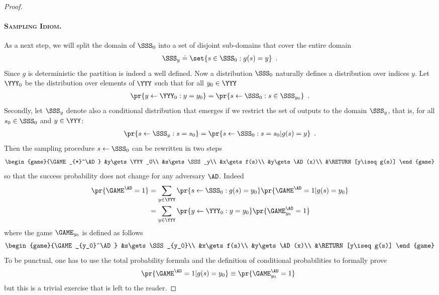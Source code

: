 \documentclass{llncs}
\begin{document}
\begin{proof}
\paragraph{\textsc{Sampling Idiom}.}
As a next step, we will split the domain of $\SSS_0$ into a set of
disjoint sub-domains that cover the entire domain
\begin{align*}
  \SSS_y\doteq\set{s\in\SSS_0: g(s)=y}\enspace.
\end{align*}
Since $g$ is deterministic the partition is indeed a well defined. Now
a distribution $\SSS_0$ naturally defines a distribution over indices
$y$. Let $\YYY_0$ be the distribution over elements of $\YYY$ such that
for all $y_0\in\YYY$
\begin{align*}
  \pr{y\gets\YYY_0:y=y_0}=\pr{s\gets\SSS_0:s\in\SSS_{y_0}}\enspace.
\end{align*}
Secondly, let $\SSS_y$ denote also a conditional distribution that
emerges if we restrict the set of outputs to the domain $\SSS_y$, that
is, for all $s_0\in\SSS_0$ and $y\in\YYY$:
\begin{align*}
  \pr{s\gets\SSS_y:s=s_0}=\pr{s\gets \SSS_0: s=s_0|g(s)=y}\enspace.
\end{align*}
Then the sampling procedure $s\gets\SSS_0$ can be rewritten in two steps
\begin{align*}
  \begin{game}{\GAME_{*}^\AD}
    &y\gets\YYY_0\\
    &s\gets\SSS_y\\
    &x\gets f(s)\\
    &y\gets\AD(x)\\
    &\RETURN [y\iseq g(s)]
  \end{game}
\end{align*}
so that the success probability does not change for any adversary
$\AD$. Indeed
\begin{align*}
  \pr{\GAME^{\AD}=1}%
  &= \sum_{y\in\YYY}\pr{s\gets\SSS_0: g(s)=y_0}\pr{\GAME^{\AD}=1|g(s)=y_0}\\
  &= \sum_{y\in\YYY}\pr{y\gets\YYY_0: y=y_0}\pr{\GAME_{y_0}^{\AD}=1}
\end{align*}
where the game $\GAME_{y_0}$ is defined as follows
\begin{align*}
  \begin{game}{\GAME_{y_0}^\AD}
    &s\gets\SSS_{y_0}\\
    &x\gets f(s)\\
    &y\gets\AD(x)\\
    &\RETURN [y\iseq g(s)]
  \end{game}  
\end{align*}
To be punctual, one has to use the total probability formula and the
definition of conditional probabilities to formally prove
\begin{align*}
 \pr{\GAME^{\AD}=1|g(s)=y_0}\equiv  \pr{\GAME_{y_0}^{\AD}=1}\enspace
\end{align*}
but this is a trivial exercise that is left to the reader. 


\end{proof}
\end{document}
